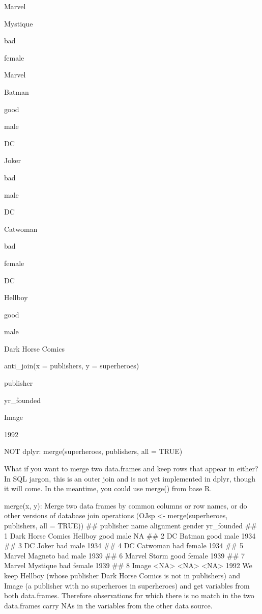 Marvel
 


Mystique
 
bad
 
female
 
Marvel
 


Batman
 
good
 
male
 
DC
 


Joker
 
bad
 
male
 
DC
 


Catwoman
 
bad
 
female
 
DC
 


Hellboy
 
good
 
male
 
Dark Horse Comics
 


anti_join(x = publishers, y = superheroes)
 


publisher
 
yr_founded
 



Image
 
1992
 



NOT dplyr: merge(superheroes, publishers, all = TRUE)
 
What if you want to merge two data.frames and keep rows that appear in either? In SQL jargon, this is an outer join and is not yet implemented in dplyr, though it will come. In the meantime, you could use merge() from base R.
 

merge(x, y): Merge two data frames by common columns or row names, or do other versions of database join operations
 (OJsp <- merge(superheroes, publishers, all = TRUE)) ##           publisher     name alignment gender yr_founded
## 1 Dark Horse Comics  Hellboy      good   male         NA
## 2                DC   Batman      good   male       1934
## 3                DC    Joker       bad   male       1934
## 4                DC Catwoman       bad female       1934
## 5            Marvel  Magneto       bad   male       1939
## 6            Marvel    Storm      good female       1939
## 7            Marvel Mystique       bad female       1939
## 8             Image     <NA>      <NA>   <NA>       1992 
We keep Hellboy (whose publisher Dark Horse Comics is not in publishers) and Image (a publisher with no superheroes in superheroes) and get variables from both data.frames. Therefore observations for which there is no match in the two data.frames carry NAs in the variables from the other data source.
 



